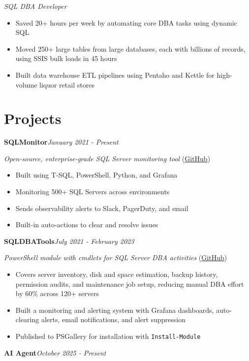 \documentclass[10pt,a4paper]{article}
\begin{document}
\textit{SQL DBA Developer}\\[-5pt]
\begin{itemize}
  \item Saved 20+ hours per week by automating core DBA tasks using dynamic SQL
  \item Moved 250+ large tables from large databases, each with billions of records, using SSIS bulk loads in 45 hours
  \item Built data warehouse ETL pipelines using Pentaho and Kettle for high-volume liquor retail stores
\end{itemize}

\section{Projects}

\noindent\textbf{SQLMonitor}\hfill \textit{January 2021 - Present}

\textit{Open-source, enterprise-grade SQL Server monitoring tool} (\href{https://github.com/imajaydwivedi/SQLMonitor}{GitHub})
\begin{itemize}
  \item Built using T-SQL, PowerShell, Python, and Grafana
  \item Monitoring 500+ SQL Servers across environments
  \item Sends observability alerts to Slack, PagerDuty, and email
  \item Built-in auto-actions to clear and resolve issues
\end{itemize}
\vspace{14.7pt}
\noindent\textbf{SQLDBATools}\hfill \textit{July 2021 - February 2023}

\textit{PowerShell module with cmdlets for SQL Server DBA activities} (\href{https://github.com/imajaydwivedi/SQLDBATools}{GitHub})
\begin{itemize}
  \item Covers server inventory, disk and space estimation, backup history, permission audits, and maintenance job setup, reducing manual DBA effort by 60\% across 120+ servers
  \item Built a monitoring and alerting system with Grafana dashboards, auto-clearing alerts, email notifications, and alert suppression
  \item Published to PSGallery for installation with \texttt{Install-Module}
\end{itemize}
\vspace{14.7pt}
\noindent\textbf{AI Agent}\hfill \textit{October 2025 - Present}
\end{document}
